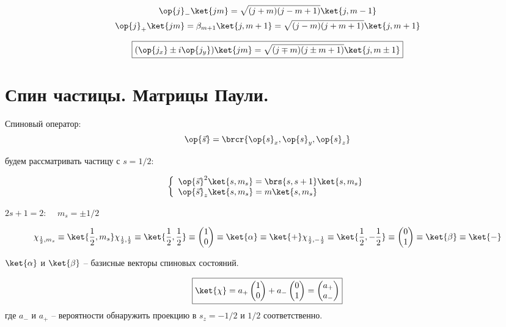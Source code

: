 $$
\begin{gathered}
\op{j}_{-} \ket{jm} = \sqrt{(j+m)(j-m+1)} \ket{j, m-1} \\
\op{j}_{+} \ket{jm} = \beta_{m+1} \ket{j, m+1} = \sqrt{(j-m)(j+m+1)} \ket{j, m+1}
\end{gathered}
$$

\begin{equation}
\label{eq:8_2_8}
\boxed {
	(\op{j_x} \pm i \op{j_y}) \ket{jm} = \sqrt{(j \mp m)(j \pm m + 1)} \ket{j, m \pm 1}
}
\end{equation}


\section{Спин частицы. Матрицы Паули.}

Спиновый оператор:
$$
\op{\vec{s}} = \brcr{\op{s}_x, \op{s}_y, \op{s}_z}
$$

будем рассматривать частицу с $s = 1/2$:

\begin{equation}
\label{eq:8_3_1}
\left\{
\begin{array}{l}
\op{\vec{s}}^2 \ket{s, m_s} = \brs{s, s+1} \ket{s, m_s}\\
\op{\vec{s}}_z \ket{s, m_s} = m \ket{s, m_s}
\end{array}
\right.
\end{equation}

$2s + 1 = 2$:~~ $m_s = \pm 1/2$

\begin{equation}
\label{eq:8_3_2}
\chi_{\frac{1}{2}, m_s} \equiv \ket{\frac{1}{2}, m_s}\\
\chi_{\frac{1}{2}, \frac{1}{2}} \equiv \ket{\frac{1}{2}, \frac{1}{2}} \equiv \begin{pmatrix} 1 \\ 0 \end{pmatrix} \equiv \ket{\alpha} \equiv \ket{+}
\chi_{\frac{1}{2}, -\frac{1}{2}} \equiv \ket{\frac{1}{2}, -\frac{1}{2}} \equiv \begin{pmatrix} 0 \\ 1 \end{pmatrix} \equiv \ket{\beta} \equiv \ket{-}
\end{equation}

$\ket{\alpha}$ и $\ket{\beta}$ -- базисные векторы спиновых состояний.

\begin{equation}
\label{eq:8_3_3}
\boxed{
	\ket{\chi} = a_{+} \begin{pmatrix} 1 \\ 0 \end{pmatrix} + a_{-} \begin{pmatrix} 0 \\ 1 \end{pmatrix} = \begin{pmatrix} a_{+} \\ a_{-} \end{pmatrix}
}
\end{equation}
где $a_{-}$ и $a_{+}$ -- вероятности обнаружить проекцию в $s_z = -1/2$ и $1/2$ соответственно.

